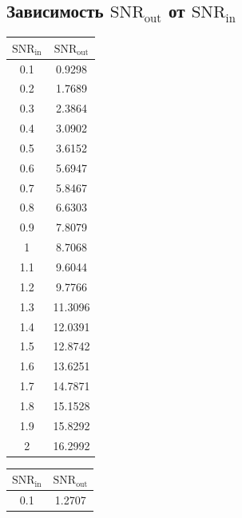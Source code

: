 \documentclass[12pt, a4paper] {ncc}
\begin{document}
    \subsection{Зависимость $\text{SNR}_{\text{out}}$ от $\text{SNR}_{\text{in}}$}
        \begin{table}[H]
            \begin{tabular} { |c|c| }
                \hline
					$\text{SNR}_\text{in}$ & $\text{SNR}_\text{out}$ \\ \hline
                    0.1  &   0.9298	\\ \hline
                    0.2  &   1.7689	\\ \hline
                    0.3  &   2.3864	\\ \hline
                    0.4  &   3.0902	\\ \hline
                    0.5  &   3.6152	\\ \hline
                    0.6  &   5.6947	\\ \hline
                    0.7  &   5.8467	\\ \hline
                    0.8  &   6.6303	\\ \hline
                    0.9  &   7.8079	\\ \hline
                    1    &   8.7068	\\ \hline
                    1.1  &   9.6044	\\ \hline
                    1.2  &   9.7766	\\ \hline
                    1.3  &   11.3096	\\ \hline
                    1.4  &   12.0391	\\ \hline
                    1.5  &   12.8742	\\ \hline
                    1.6  &   13.6251	\\ \hline
                    1.7  &   14.7871	\\ \hline
                    1.8  &   15.1528	\\ \hline
                    1.9  &   15.8292	\\ \hline
                    2    &   16.2992	\\ \hline
            \end{tabular}
            \begin{tabular} { |c|c| }
                \hline
					$\text{SNR}_\text{in}$ & $\text{SNR}_\text{out}$ \\ \hline
                        0.1   &  1.2707	\\ \hline

\end{tabular}
\end{table}
\end{document}
